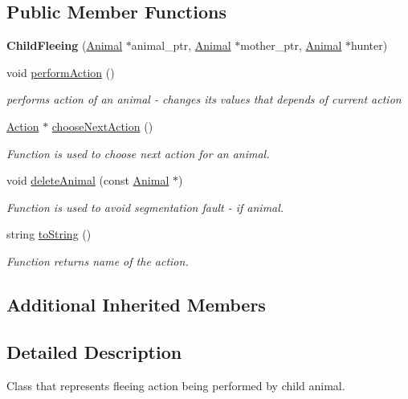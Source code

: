 \subsection*{Public Member Functions}
\begin{DoxyCompactItemize}
\item 
\hypertarget{class_child_fleeing_aab3b98e37f96eb6b7fddc8d57e519b3c}{}{\bfseries Child\+Fleeing} (\hyperlink{class_animal}{Animal} $\ast$animal\+\_\+ptr, \hyperlink{class_animal}{Animal} $\ast$mother\+\_\+ptr, \hyperlink{class_animal}{Animal} $\ast$hunter)\label{class_child_fleeing_aab3b98e37f96eb6b7fddc8d57e519b3c}

\item 
void \hyperlink{class_child_fleeing_a9d2303d3aa71501e99c96aac579fbf59}{perform\+Action} ()
\begin{DoxyCompactList}\small\item\em performs action of an animal -\/ changes it\textquotesingle{}s values that depends of current action \end{DoxyCompactList}\item 
\hyperlink{class_action}{Action} $\ast$ \hyperlink{class_child_fleeing_a4be1b2a301b82cbfc6564f77e950e3fd}{choose\+Next\+Action} ()
\begin{DoxyCompactList}\small\item\em Function is used to choose next action for an animal. \end{DoxyCompactList}\item 
void \hyperlink{class_child_fleeing_a57d77a6418b9b1a0b3fd6d1532e2b353}{delete\+Animal} (const \hyperlink{class_animal}{Animal} $\ast$)
\begin{DoxyCompactList}\small\item\em Function is used to avoid segmentation fault -\/ if animal. \end{DoxyCompactList}\item 
string \hyperlink{class_child_fleeing_a3bc6767ccf4f3783217db650e3002502}{to\+String} ()
\begin{DoxyCompactList}\small\item\em Function returns name of the action. \end{DoxyCompactList}\end{DoxyCompactItemize}
\subsection*{Additional Inherited Members}


\subsection{Detailed Description}
Class that represents fleeing action being performed by child animal. 


